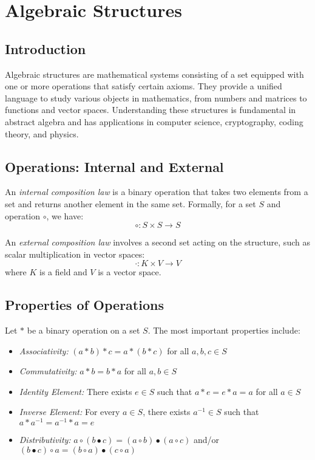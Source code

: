 \newpage
\section{Algebraic Structures}

\subsection{Introduction}

Algebraic structures are mathematical systems consisting of a set equipped with one or more operations that satisfy certain axioms. They provide a unified language to study various objects in mathematics, from numbers and matrices to functions and vector spaces. Understanding these structures is fundamental in abstract algebra and has applications in computer science, cryptography, coding theory, and physics.

\subsection{Operations: Internal and External}

An \emph{internal composition law} is a binary operation that takes two elements from a set and returns another element in the same set. Formally, for a set \(S\) and operation \(\circ\), we have:
\[
\circ: S \times S \rightarrow S
\]

An \emph{external composition law} involves a second set acting on the structure, such as scalar multiplication in vector spaces:
\[
\cdot: K \times V \rightarrow V
\]
where \(K\) is a field and \(V\) is a vector space.

\subsection{Properties of Operations}

Let \(\ast\) be a binary operation on a set \(S\). The most important properties include:

\begin{itemize}[label=\(-\)]
    \item \emph{Associativity:} \((a \ast b) \ast c = a \ast (b \ast c)\) for all \(a,b,c \in S\)
    \item \emph{Commutativity:} \(a \ast b = b \ast a\) for all \(a,b \in S\)
    \item \emph{Identity Element:} There exists \(e \in S\) such that \(a \ast e = e \ast a = a\) for all \(a \in S\)
    \item \emph{Inverse Element:} For every \(a \in S\), there exists \(a^{-1} \in S\) such that \(a \ast a^{-1} = a^{-1} \ast a = e\)
    \item \emph{Distributivity:} \(a \circ (b \bullet c) = (a \circ b) \bullet (a \circ c)\) and/or \((b \bullet c) \circ a = (b \circ a) \bullet (c \circ a)\)
\end{itemize}

